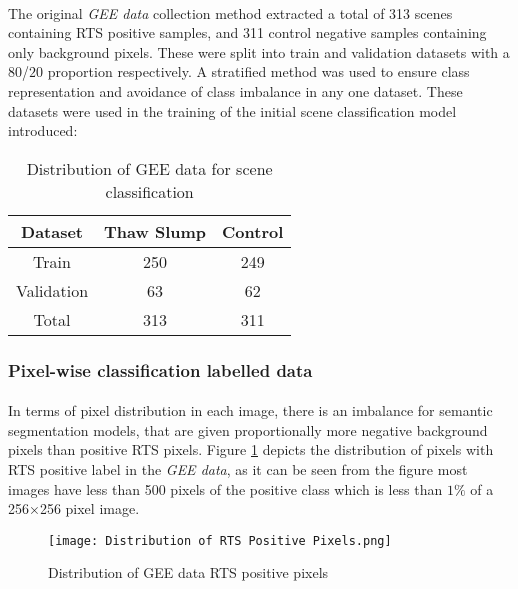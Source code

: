 \paragraph{}
The original \textit{\gls{GEE} data} collection method extracted a total of 313 scenes containing \gls{RTS} positive samples, and 311 control negative samples containing only background pixels. These were split into train and validation datasets with a $80$/$20$ proportion respectively. A stratified method was used to ensure class representation and avoidance of class imbalance in any one dataset. These datasets were used in the training of the initial scene classification model introduced:
\begin{table}[ht!] 
    \begin{center}
    \begin{tabular}{c|c|c}    
    \textbf{Dataset} & \textbf{Thaw Slump} & \textbf{Control} \\
    \hline
    Train 
    &  250
    & 249  \\
    \hline
    Validation 
    &  63
    & 62  \\
    \hline
    Total 
    &  313
    & 311  \\
    \hline
    \end{tabular}
    \end{center}
    \caption{Distribution of \gls{GEE} data for scene classification}\label{table_label_data_class}
\end{table}
\subsubsection{Pixel-wise classification labelled data}
\paragraph{}
In terms of pixel distribution in each image, there is an imbalance for semantic segmentation models, that are given proportionally more negative background pixels than positive \gls{RTS} pixels. 
Figure \ref{rts_pixel_dist} depicts the distribution of pixels with \gls{RTS} positive label in the \textit{\gls{GEE} data}, as it can be seen from the figure most images have less than 500 pixels of the positive class which is less than $1\%$ of a 256×256 pixel image.

    \begin{figure}[hbt!]
        \centering
        \texttt{[image: Distribution of RTS Positive Pixels.png]}
        \caption{Distribution of \gls{GEE} data \gls{RTS} positive pixels}
        \label{rts_pixel_dist}
    \end{figure}
    
